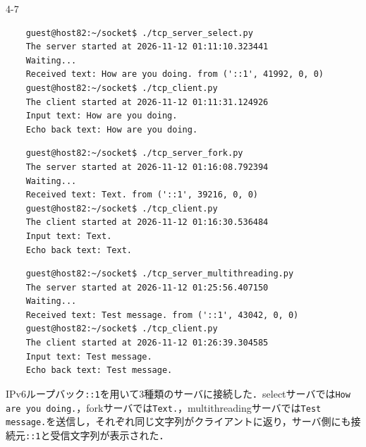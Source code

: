 \begin{maintask}{4-7}
  \begin{termout}[H]
    \caption{selectサーバの実行結果}\label{out:select_server}
    \begin{verbatim}
    guest@host82:~/socket$ ./tcp_server_select.py
    The server started at 2026-11-12 01:11:10.323441
    Waiting...
    Received text: How are you doing. from ('::1', 41992, 0, 0)
    guest@host82:~/socket$ ./tcp_client.py
    The client started at 2026-11-12 01:11:31.124926
    Input text: How are you doing.
    Echo back text: How are you doing.
    \end{verbatim}
  \end{termout}
  \begin{termout}[H]
    \caption{forkサーバの実行結果}\label{out:fork_server}
    \begin{verbatim}
    guest@host82:~/socket$ ./tcp_server_fork.py
    The server started at 2026-11-12 01:16:08.792394
    Waiting...
    Received text: Text. from ('::1', 39216, 0, 0)
    guest@host82:~/socket$ ./tcp_client.py
    The client started at 2026-11-12 01:16:30.536484
    Input text: Text.
    Echo back text: Text.
    \end{verbatim}
  \end{termout}
  \begin{termout}[H]
    \caption{multithreadingサーバの実行結果}\label{out:thread_client}
    \begin{verbatim}
    guest@host82:~/socket$ ./tcp_server_multithreading.py
    The server started at 2026-11-12 01:25:56.407150
    Waiting...
    Received text: Test message. from ('::1', 43042, 0, 0)
    guest@host82:~/socket$ ./tcp_client.py
    The client started at 2026-11-12 01:26:39.304585
    Input text: Test message.
    Echo back text: Test message.
    \end{verbatim}
  \end{termout}

  IPv6ループバック\texttt{::1}を用いて3種類のサーバに接続した．selectサーバでは\texttt{How are you doing.}，forkサーバでは\texttt{Text.}，multithreadingサーバでは\texttt{Test message.}を送信し，それぞれ同じ文字列がクライアントに返り，サーバ側にも接続元\texttt{::1}と受信文字列が表示された．
\end{maintask}
